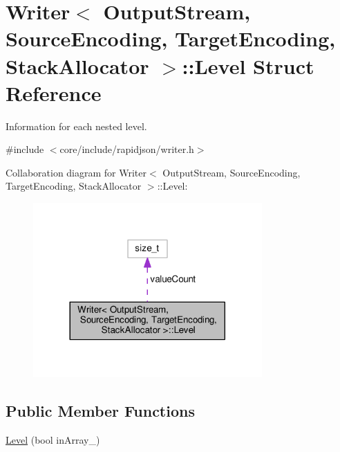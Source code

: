 \hypertarget{structWriter_1_1Level}{}\section{Writer$<$ Output\+Stream, Source\+Encoding, Target\+Encoding, Stack\+Allocator $>$\+:\+:Level Struct Reference}
\label{structWriter_1_1Level}


Information for each nested level.  




{\ttfamily \#include $<$core/include/rapidjson/writer.\+h$>$}



Collaboration diagram for Writer$<$ Output\+Stream, Source\+Encoding, Target\+Encoding, Stack\+Allocator $>$\+:\+:Level\+:
\nopagebreak
\begin{figure}[H]
\begin{center}
\leavevmode
\includegraphics[width=248pt]{structWriter_1_1Level__coll__graph}
\end{center}
\end{figure}
\subsection*{Public Member Functions}
\begin{DoxyCompactItemize}
\item 
\hyperlink{structWriter_1_1Level_a4c9d2a6336d707725cd749b80059e59d}{Level} (bool in\+Array\+\_\+)
\end{DoxyCompactItemize}
